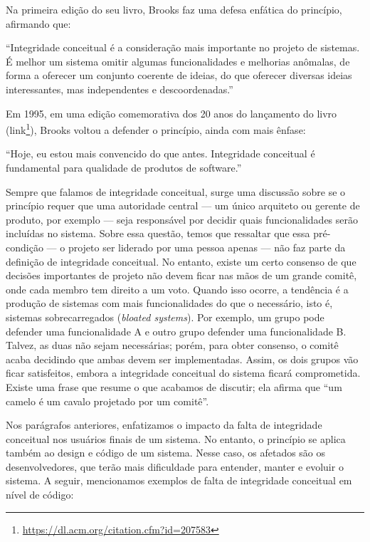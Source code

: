 \documentclass[
  11pt,
  twoside]{book}
\DeclareRobustCommand{\href}[2]{#2\footnote{\url{#1}}}
\renewenvironment{quote}{\centering \vspace{1.5ex} \begin{tcolorbox}[colback=backcolor, width=4.9in]}{\end{tcolorbox}}
\begin{document}
 Na primeira edição do seu livro, Brooks faz
uma defesa enfática do princípio, afirmando que:

\begin{quote}
``Integridade conceitual é a consideração mais importante no projeto de
sistemas. É melhor um sistema omitir algumas funcionalidades e melhorias
anômalas, de forma a oferecer um conjunto coerente de ideias, do que
oferecer diversas ideias interessantes, mas independentes e
descoordenadas.''
\end{quote}

Em 1995, em uma edição comemorativa dos 20 anos do lançamento do livro
(\href{https://dl.acm.org/citation.cfm?id=207583}{link}), Brooks voltou
a defender o princípio, ainda com mais ênfase:

\begin{quote}
``Hoje, eu estou mais convencido do que antes. Integridade conceitual é
fundamental para qualidade de produtos de software.''
\end{quote}

Sempre que falamos de integridade conceitual, surge uma discussão sobre
se o princípio requer que uma autoridade central --- um único arquiteto
ou gerente de produto, por exemplo --- seja responsável por decidir
quais funcionalidades serão incluídas no sistema. Sobre essa questão,
temos que ressaltar que essa pré-condição --- o projeto ser liderado por
uma pessoa apenas --- não faz parte da definição de integridade
conceitual. No entanto, existe um certo consenso de que decisões
importantes de projeto não devem ficar nas mãos de um grande comitê,
onde cada membro tem direito a um voto. Quando isso ocorre, a tendência
é a produção de sistemas com mais funcionalidades do que o necessário,
isto é, sistemas sobrecarregados (\emph{bloated systems}). Por exemplo,
um grupo pode defender uma funcionalidade A e outro grupo defender uma
funcionalidade B. Talvez, as duas não sejam necessárias; porém, para
obter consenso, o comitê acaba decidindo que ambas devem ser
implementadas. Assim, os dois grupos vão ficar satisfeitos, embora a
integridade conceitual do sistema ficará comprometida. Existe uma frase
que resume o que acabamos de discutir; ela afirma que ``um camelo é um
cavalo projetado por um comitê''.

Nos parágrafos anteriores, enfatizamos o impacto da falta de integridade
conceitual nos usuários finais de um sistema. No entanto, o princípio se
aplica também ao design e código de um sistema. Nesse caso, os afetados
são os desenvolvedores, que terão mais dificuldade para entender, manter
e evoluir o sistema. A seguir, mencionamos exemplos de falta de
integridade conceitual em nível de código:
\end{document}
